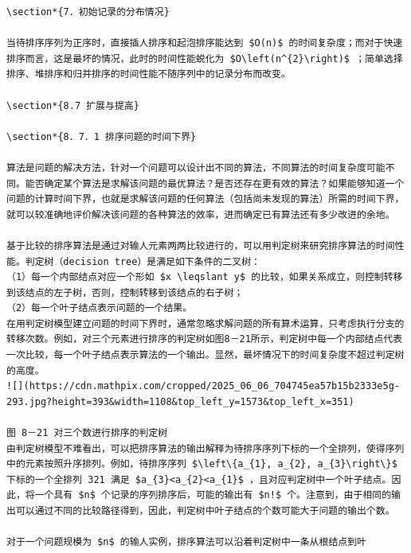 \documentclass[10pt]{article}
\begin{document}
\begin{verbatim}
\section*{7．初始记录的分布情况}

当待排序序列为正序时，直接插人排序和起泡排序能达到 $O(n)$ 的时间复杂度；而对于快速排序而言，这是最坏的情况，此时的时间性能蜕化为 $O\left(n^{2}\right)$ ；简单选择排序、堆排序和归并排序的时间性能不随序列中的记录分布而改变。

\section*{8.7 扩展与提高}

\section*{8．7．1 排序问题的时间下界}

算法是问题的解决方法，针对一个问题可以设计出不同的算法，不同算法的时间复杂度可能不同。能否确定某个算法是求解该问题的最优算法？是否还存在更有效的算法？如果能够知道一个问题的计算时间下界，也就是求解该问题的任何算法（包括尚未发现的算法）所需的时间下界，就可以较准确地评价解决该问题的各种算法的效率，进而确定已有算法还有多少改进的余地。

基于比较的排序算法是通过对输人元素两两比较进行的，可以用判定树来研究排序算法的时间性能。判定树（decision tree）是满足如下条件的二叉树：
（1）每一个内部结点对应一个形如 $x \leqslant y$ 的比较，如果关系成立，则控制转移到该结点的左子树，否则，控制转移到该结点的右子树；
（2）每一个叶子结点表示问题的一个结果。
在用判定树模型建立问题的时间下界时，通常忽略求解问题的所有算术运算，只考虑执行分支的转移次数。例如，对三个元素进行排序的判定树如图8－21所示，判定树中每一个内部结点代表一次比较，每一个叶子结点表示算法的一个输出。显然，最坏情况下的时间复杂度不超过判定树的高度。
![](https://cdn.mathpix.com/cropped/2025_06_06_704745ea57b15b2333e5g-293.jpg?height=393&width=1108&top_left_y=1573&top_left_x=351)

图 8－21 对三个数进行排序的判定树
由判定树模型不难看出，可以把排序算法的输出解释为待排序序列下标的一个全排列，使得序列中的元素按照升序排列。例如，待排序序列 $\left\{a_{1}, a_{2}, a_{3}\right\}$ 下标的一个全排列 321 满足 $a_{3}<a_{2}<a_{1}$ ，且对应判定树中一个叶子结点。因此，将一个具有 $n$ 个记录的序列排序后，可能的输出有 $n!$ 个。注意到，由于相同的输出可以通过不同的比较路径得到，因此，判定树中叶子结点的个数可能大于问题的输出个数。

对于一个问题规模为 $n$ 的输人实例，排序算法可以沿着判定树中一条从根结点到叶


\end{verbatim}
\end{document}

